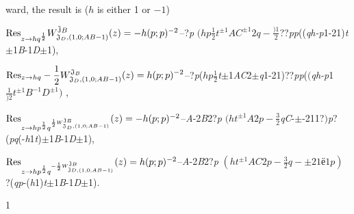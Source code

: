 \documentclass[a4paper,12pt]{article}
\begin{document}
ward, the result is ($h$ is either 1 or $-1$)

${\rm Res}_{z\rightarrow hq^{\frac{1}{2}}}W_{\mathfrak{J}_{D},(1,0;AB-1)}^{\tilde{\mathrm{J}}B}(z)=-h(p;p)^{-2}$--?{\it p} $(hp\displaystyle \frac{1}{2}t^{\pm 1}AC^{\pm 1}2q-\frac{)1}{2}$??{\it pp}(({\it qh-p}1-21){\it t}$\pm$1{\it B}-1{\it D}$\pm$1),

${\rm Res}_{z\rightarrow hq}-\displaystyle \frac{1}{2}W_{\mathfrak{J}_{D},(1,0;AB- 1)}^{\mathfrak{J}_{B}}(z)=h(p;p)^{-2}$--?{\it p}($hp\displaystyle \frac{1}{2}${\it t}$\pm$1{\it AC}2$\pm${\it q}1-21)??{\it pp}($(${\it qh-p}1 $\displaystyle \frac{1}{)2}t^{\pm 1}B^{-1}D^{\pm 1})$ ,

${\rm Res}_{z\rightarrow hp^{\frac{1}{2}}q^{\frac{1}{2}W_{\mathfrak{J}_{D},(1,0;AB-1)}^{\tilde{\mathrm{J}}B}}}(z)=-h(p;p)^{-2}$--{\it A}-2{\it B}2?{\it p} $(ht^{\pm 1}A2p-\displaystyle \frac{3}{2}${\it qC}-$\pm$-211?$)${\it p}?({\it pq}(-{\it h}1{\it t})$\pm$1{\it B}-1{\it D}$\pm$1),

${\rm Res}_{z\rightarrow hp^{\frac{1}{2}}q^{-\frac{1}{2}W_{\tilde{\mathrm{J}}D,(1,0;AB-1)}^{\tilde{\mathrm{J}}B}}}(z)=h(p;p)^{-2}$--{\it A}-2{\it B}2?{\it p} $(ht^{\pm 1}AC2p-\displaystyle \frac{3}{2}q-\pm 21ё 1p)$ ?({\it qp}-({\it h}1){\it t}$\pm$1{\it B}-1{\it D}$\pm$1).

1
\end{document}
